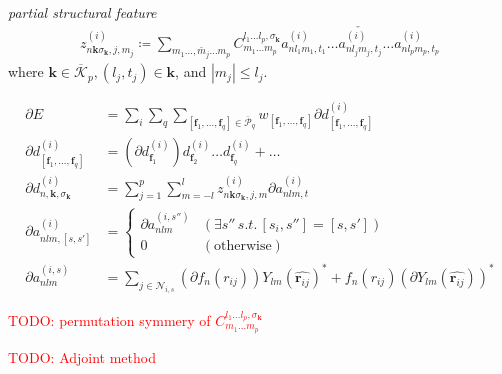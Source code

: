\documentclass[a4paper, 11pt]{article}
\theoremstyle{definition}
\newcommand{\term}[1]{\textit{#1}}
\newcommand{\todo}[1]{\textcolor{red}{TODO: #1}}
\begin{document}
\term{partial structural feature}
\begin{align}
  z^{(i)}_{ n \mathbf{k} \sigma_{\mathbf{k}}, j, m_{j} }
  \coloneqq
  \sum_{ m_{1} \dots, \check{m_{j}} \dots m_{p} }
    C^{l_{1} \dots l_{p}, \sigma_{\mathbf{k}} }_{m_{1} \dots m_{p}} a^{(i)}_{nl_{1}m_{1}, t_{1}} \dots \check{ a^{(i)}_{nl_{j}m_{j}, t_{j}} } \dots a^{(i)}_{n l_{p} m_{p}, t_{p}}
\end{align}
where $\mathbf{k} \in \overline{\mathcal{K}}_{p}, (l_{j}, t_{j}) \in \mathbf{k}$, and $|m_{j}| \leq l_{j}$.

\begin{align}
  \partial E
  &= \sum_{i} \sum_{q} \sum_{ [\mathbf{f}_{1}, \dots, \mathbf{f}_{q}] \in \overline{\mathcal{P}}_{q} }
        w_{ [\mathbf{f}_{1}, \dots, \mathbf{f}_{q}] } \partial d^{(i)}_{ [\mathbf{f}_{1}, \dots, \mathbf{f}_{q}] } \\
  \partial d^{(i)}_{ [\mathbf{f}_{1}, \dots, \mathbf{f}_{q}] }
  &= \left( \partial d^{(i)}_{\mathbf{f}_{1}} \right) d^{(i)}_{\mathbf{f}_{2}} \dots d^{(i)}_{\mathbf{f}_{q}} + \dots \\
  \partial d^{(i)}_{n, \mathbf{k}, \sigma_{\mathbf{k}}}
  &= \sum_{ j = 1 }^{p} \sum_{ m = -l}^{l} z^{(i)}_{ n \mathbf{k} \sigma_{\mathbf{k}}, j, m } \partial a^{(i)}_{nlm, t} \\
  \partial a^{(i)}_{nlm, [s, s']}
  &= \begin{cases}
    \partial a^{(i, s'')}_{nlm} & (\exists s'' \,s.t.\, [s_{i}, s''] = [s, s'] ) \\
    0 & (\mbox{otherwise})
  \end{cases} \\
  \partial a^{(i, s)}_{nlm}
  &= \sum_{ j \in \mathcal{N}_{i,s} }
        \left( \partial f_{n}(r_{ij}) \right) Y_{lm}(\hat{\mathbf{r}_{ij}})^{\ast}
        + f_{n}(r_{ij}) \left( \partial Y_{lm}(\hat{\mathbf{r}_{ij}}) \right)^{\ast}
\end{align}

\todo{permutation symmery of $ C^{l_{1} \dots l_{p}, \sigma_{\mathbf{k}} }_{m_{1} \dots m_{p}} $}

\todo{Adjoint method}

% 
% 
\end{document}
